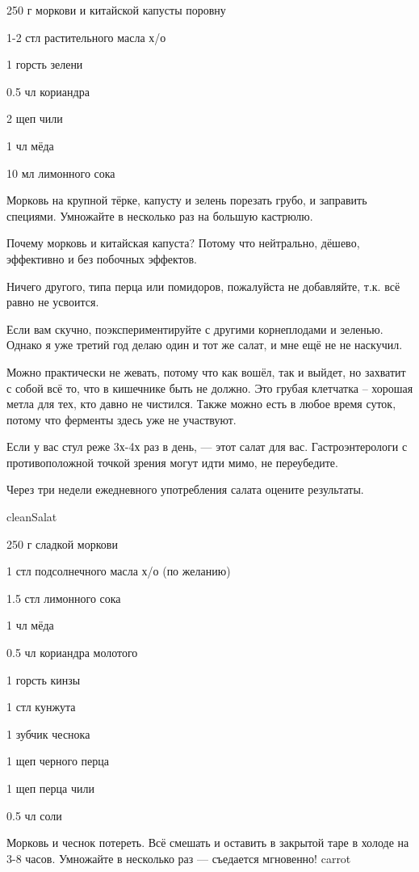 {\label{cleanSalad}
\item 250 г моркови и китайской капусты поровну
\item 1-2 стл растительного масла х/о 
\item 1 горсть зелени
}{
\item 0.5 чл кориандра
\item 2 щеп чили
\item 1 чл мёда
\item 10 мл лимонного сока
}{
Морковь на крупной тёрке, капусту и зелень порезать грубо, и заправить специями. Умножайте в несколько раз на большую кастрюлю.
}{
\begin{advice}
\item Почему морковь и китайская капуста? Потому что нейтрально, дёшево, эффективно и без побочных эффектов. 
\item Ничего другого, типа перца или помидоров, пожалуйста не добавляйте, т.к. всё равно не усвоится. 
\item Если вам скучно, поэкспериментируйте с другими корнеплодами и зеленью. Однако я уже третий год делаю один и тот же салат, и мне ещё не не наскучил.

\item Можно практически не жевать, потому что как вошёл, так и выйдет, но захватит с собой всё то, что в кишечнике быть не должно. Это грубая клетчатка – хорошая метла для тех, кто давно не чистился. Также можно есть в любое время суток, потому что ферменты здесь уже не участвуют.
\item Если у вас стул реже 3х-4х раз в день, — этот салат для вас. 
Гастроэнтерологи с противоположной точкой зрения могут идти мимо, не переубедите.


\item Через три недели ежедневного употребления салата оцените результаты. 

\end{advice}
}{cleanSalat}




{
\item 250 г сладкой моркови
\item 1 стл подсолнечного масла х/о (по желанию)
\item 1.5 стл лимонного сока 
\item 1 чл мёда
\item 0.5 чл кориандра молотого
\item 1 горсть кинзы
}{
\item 1 стл кунжута
\item 1 зубчик чеснока
\item 1 щеп черного перца
\item 1 щеп перца чили
\item 0.5 чл соли
}{
Морковь и чеснок потереть. Всё смешать и оставить в закрытой таре в холоде на 3-8 часов. Умножайте в несколько раз — съедается мгновенно!
}{}{carrot}



